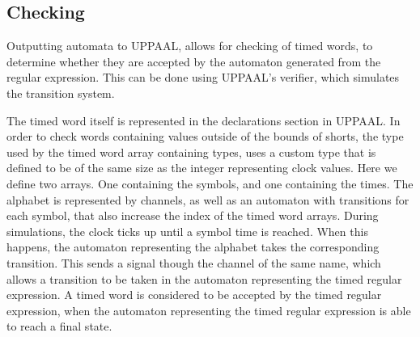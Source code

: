\subsection{Checking}\label{subsec:checking}

Outputting automata to UPPAAL, allows for checking of timed words, to determine whether they are accepted by the automaton generated from the regular expression. 
This can be done using UPPAAL's verifier, which simulates the transition system.

The timed word itself is represented in the declarations section in UPPAAL.
In order to check words containing values outside of the bounds of shorts, the type used by the timed word array containing types, uses a custom type that is defined to be of the same size as the integer representing clock values.
Here we define two arrays. One containing the symbols, and one containing the times. 
The alphabet is represented by channels, as well as an automaton with transitions for each symbol, that also increase the index of the timed word arrays.
During simulations, the clock ticks up until a symbol time is reached. When this happens, the automaton representing the alphabet takes the corresponding transition. 
This sends a signal though the channel of the same name, which allows a transition to be taken in the automaton representing the timed regular expression.
A timed word is considered to be accepted by the timed regular expression, when the automaton representing the timed regular expression is able to reach a final state.


